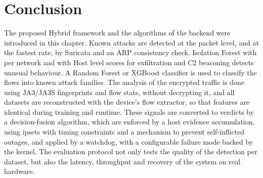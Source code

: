 \section{Conclusion}\label{sec:5.11}
\label{sec:ch5conclusion}
\noindent The proposed Hybrid framework and the algorithms of the backend were introduced in this chapter. Known attacks are detected at the packet level, and at the fastest rate, by Suricata and an ARP consistency check. Isolation Forest with per network and with Host level scores for exfiltration and C2 beaconing detects unusual behaviour. A Random Forest or XGBoost classifier is used to classify the flows into known attack families. The analysis of the encrypted traffic is done using JA3/JA3S fingerprints and flow stats, without decrypting it, and all datasets are reconstructed with the device's flow extractor, so that features are identical during training and runtime. These signals are converted to verdicts by a decision-fusion algorithm, which are enforced by a host evidence accumulation, using ipsets with timing constraints and a mechanism to prevent self-inflicted outages, and applied by a watchdog, with a configurable failure mode backed by the kernel. The evaluation protocol not only tests the quality of the detection per dataset, but also the latency, throughput and recovery of the system on real hardware.